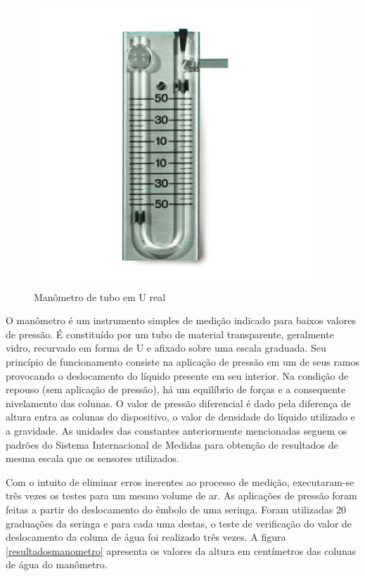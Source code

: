 \begin{figure}[H]
		\centering
			\includegraphics[scale=1.0]{figuras/manometro2.png}
		\caption{Manômetro de tubo em U real}
		\label{manometro2}
\end{figure}

O manômetro é um instrumento simples de medição indicado para baixos valores de pressão. É constituído por um tubo de material transparente, geralmente vidro, recurvado em forma de U e afixado sobre uma escala graduada. Seu princípio de funcionamento consiste na aplicação de pressão em um de seus ramos provocando o deslocamento do líquido presente em seu interior. Na condição de repouso (sem aplicação de pressão), há um equilíbrio de forças e a consequente nivelamento das colunas. O valor de pressão diferencial é dado pela diferença de altura entra as colunas do dispositivo, o valor de densidade do líquido utilizado e a gravidade. As unidades das constantes anteriormente mencionadas seguem os padrões do Sistema Internacional de Medidas para obtenção de resultados de mesma escala que os sensores utilizados.

Com o intuito de eliminar erros inerentes ao processo de medição, executaram-se três vezes os testes para um mesmo volume de ar. As aplicações de pressão foram feitas a partir do deslocamento do êmbolo de uma seringa. Foram utilizadas 20 graduações da seringa e para cada uma destas, o teste de verificação do valor de deslocamento da coluna de água foi realizado três vezes. A figura \ref{resultadosmanometro} apresenta os valores da altura em centímetros das colunas de água do manômetro. 

